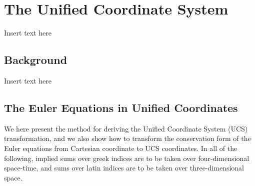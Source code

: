 \chapter{The Unified Coordinate System}
\label{chpt:UCS}

Insert text here

\section{Background}
\label{sec:UCS-background}

Insert text here

\section{The Euler Equations in Unified Coordinates}
\label{sec:UCS-Euler}

We here present the method for deriving the Unified Coordinate System (UCS) transformation, and we also show how to transform the conservation form of the Euler equations from Cartesian coordinate to UCS coordinates. In all of the following, implied sums over greek indices are to be taken over four-dimensional space-time,  and sums over latin indices are to be taken over three-dimensional space.

